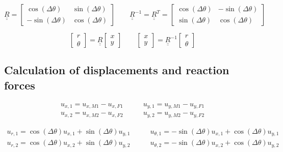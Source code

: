 \documentclass[a4paper]{jpconf}
\begin{document}
\begin{equation}
\underline{\underline{R}}=\begin{bmatrix}
\cos\left(\Delta\theta\right) & \sin\left(\Delta\theta\right) \\
-\sin\left(\Delta\theta\right) & \cos\left(\Delta\theta\right)
\end{bmatrix}\qquad\underline{\underline{R}}^{-1}=\underline{\underline{R}}^{T}=\begin{bmatrix}
\cos\left(\Delta\theta\right) & -\sin\left(\Delta\theta\right) \\
\sin\left(\Delta\theta\right) & \cos\left(\Delta\theta\right)
\end{bmatrix}
\end{equation}

\begin{equation}
\begin{bmatrix}
r \\
\theta
\end{bmatrix}=\underline{\underline{R}}\begin{bmatrix}
x \\
y
\end{bmatrix}\qquad\begin{bmatrix}
x \\
y
\end{bmatrix}=\underline{\underline{R}}^{-1}\begin{bmatrix}
r \\
\theta
\end{bmatrix}
\end{equation}

\subsection{Calculation of displacements and reaction forces}

\begin{equation}
\begin{split}
u_{x,1}=u_{x,M1}-u_{x,F1}&\qquad u_{y,1}=u_{y,M1}-u_{y,F1}\\
u_{x,2}=u_{x,M2}-u_{x,F2}&\qquad u_{y,2}=u_{y,M2}-u_{y,F2}
\end{split}
\end{equation}

\begin{equation}
\begin{split}
u_{r,1}=\cos\left(\Delta\theta\right) u_{x,1}+\sin\left(\Delta\theta\right) u_{y,1}&\qquad u_{\theta,1}=-\sin\left(\Delta\theta\right) u_{x,1}+\cos\left(\Delta\theta\right) u_{y,1}\\
u_{r,2}=\cos\left(\Delta\theta\right) u_{x,2}+\sin\left(\Delta\theta\right) u_{y,2}&\qquad u_{\theta,2}=-\sin\left(\Delta\theta\right) u_{x,2}+\cos\left(\Delta\theta\right) u_{y,2}
\end{split}
\end{equation}
\end{document}
